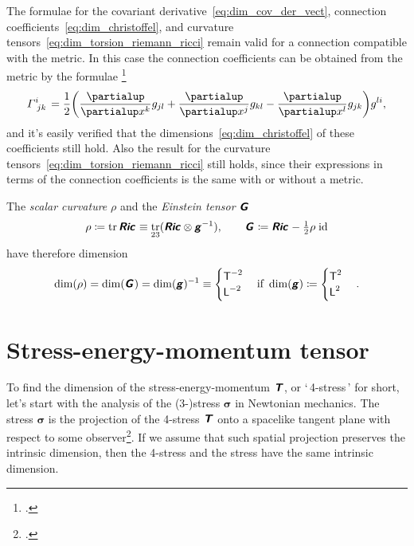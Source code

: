 \documentclass[\ifafour a4paper,12pt,\else a5paper,10pt,\fi%
onecolumn,oneside,article,%
british%
]{memoir}
\makeatletter
\newcommand*{\defquote}[1]{`\,#1\,'}
\theoremstyle{remark}
\theoremstyle{innote}
\newcommand*{\mathte}[1]{\textbf{\textit{\textsf{#1}}}}
\newcommand*{\citep}{\footcites}
\newcommand*{\de}{\partialup}%
\DeclareMathOperator{\tr}{tr}%
\newcommand*{\defd}{\coloneqq}
\renewcommand*{\|}[1][]{\nonscript\,#1\vert\nonscript\;\mathopen{}}
\newcommand*{\sect}{\S}%
\newcommand*{\q}{}%
\DeclareRobustCommand*{\q}{%
  \mathbin{\mathpalette\bigcdot@{}}%
}
\newcommand*{\bigcdot@scalefactor}{0.75}
\newcommand*{\bigcdot@widthfactor}{1.5}
\newcommand*{\bigcdot@}[2]{%
  \sbox0{$#1\vcenter{}$}%
  \sbox2{$#1\cdot\m@th$}%
  \hbox to \bigcdot@widthfactor\wd2{%
    \hfil
    \raise\ht0\hbox{%
      \scalebox{\bigcdot@scalefactor}{%
        \lower\ht0\hbox{$#1\bullet\m@th$}%
      }%
    }%
    \hfil
  }%
}
\newcommand*{\Le}{\textsf{L}}
\newcommand*{\Ti}{\textsf{T}}
\newcommand*{\yg}{\mathte{g}}
\newcommand*{\yT}{\mathte{T}}
\newcommand*{\yG}{\mathte{G}}
\newcommand*{\yRi}{\mathte{Ric}}
\newcommand*{\ysc}{\rho}
\renewcommand*{\i}{\indices}
\newcommand*{\dex}[1][i]{\frac{\de}{\de x^{#1}}}
\newcommand*{\yGa}{\varGamma}
\newcommand*{\id}{\mathrm{id}}%
\newcommand*{\yt}{\bm{\sigma}}
\makeatother
\begin{document}
The formulae for the covariant derivative~\eqref{eq:dim_cov_der_vect},
connection coefficients~\eqref{eq:dim_christoffel}, and curvature
tensors~\eqref{eq:dim_torsion_riemann_ricci} remain valid for a connection
compatible with the metric. In this case the connection coefficients can be
obtained from the metric by the formulae
\citep[\sect~V.B.2]{choquetbruhatetal1977_r1996}
\begin{equation}
  \label{eq:christoffel_g}
  \yGa\i{^{i}_{jk}} = \frac{1}{2}
  \biggl(\dex[k]g_{jl} + \dex[j]g_{kl} - \dex[l]g_{jk}\biggr)g^{li},
\end{equation}
and it's easily verified that the dimensions~\eqref{eq:dim_christoffel} of these
coefficients still hold. Also the result for
the curvature tensors~\eqref{eq:dim_torsion_riemann_ricci} still holds,
since their expressions in terms of the connection coefficients is the same
with or without a metric.

\medskip

The \emph{scalar curvature} $\ysc$ and the \emph{Einstein tensor}
$\yG\i{_{\q}^{\q}}$
\begin{equation}
  \label{eq:curv_einst}
  \ysc \defd \tr\yRi\i{_{\q}^{\q}}\equiv\tr_{23}(\yRi\otimes\yg^{-1}),
  \qquad
  \yG\i{_{\q}^{\q}} \defd \yRi\i{_{\q}^{\q}} -
  \tfrac{1}{2} \ysc\;\id\i{_{\q}^{\q}} 
\end{equation}
have therefore dimension
\begin{equation}
  \label{eq:dim_curv_einst}
  \dim(\ysc) = \dim(\yG\i{_{\q}^{\q}}) =\dim(\yg)^{-1} \equiv
  \begin{cases}
    \Ti^{-2} \\
    \Le^{-2}
  \end{cases}
  \text{if }\dim(\yg)\defd
  \begin{cases}
     \Ti^2 \\
    \Le^2
  \end{cases}.
\end{equation}

\section{Stress-energy-momentum tensor}
\label{sec:stressenergy}

To find the dimension of the stress-energy-momentum $\yT$, or
\defquote{4-stress} for short, let's start with the analysis of the
(3-)stress $\yt$ in Newtonian mechanics. The stress $\yt$ is the projection
of the 4-stress $\yT$ onto a spacelike tangent plane with respect to some
observer\citep[\sect~3.4.1]{gourgoulhon2007_r2012}{smarretal1978,york1979,smarretal1980}[\sect~1.3]{wilsonetal2003_r2007}[the
projection doesn't need to be
orthogonal:][\sect~2.4]{marsdenetal1994}[\sect~B.1.4]{hehletal2003}. If we
assume that such spatial projection preserves the intrinsic dimension, then
the 4-stress and the stress have the same intrinsic dimension.
\end{document}
